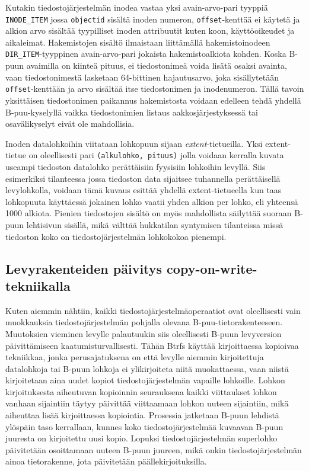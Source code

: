 Kutakin tiedostojärjestelmän inodea vastaa yksi avain-arvo-pari tyyppiä \texttt{INODE\_ITEM} jossa \texttt{objectid} sisältä inoden numeron, \texttt{offset}-kenttää ei käytetä ja alkion arvo sisältää tyypilliset inoden attribuutit kuten koon, käyttöoikeudet ja aikaleimat.
Hakemistojen sisältö ilmaistaan liittämällä hakemistoinodeen \texttt{DIR\_ITEM}-tyyppinen avain-arvo-pari jokaista hakemistoalkiota kohden.
Koska B-puun avaimilla on kiinteä pituus, ei tiedostonimeä voida lisätä osaksi avainta,
vaan tiedostonimestä lasketaan 64-bittinen hajautusarvo,
joka sisällytetään \texttt{offset}-kenttään ja arvo sisältää itse tiedostonimen ja inodenumeron.
Tällä tavoin yksittäisen tiedostonimen paikannus hakemistosta voidaan edelleen tehdä yhdellä B-puu-kyselyllä vaikka tiedostonimien listaus aakkosjärjestyksessä tai osavälikyselyt eivät ole mahdollisia.

Inoden datalohkoihin viitataan lohkopuun sijaan \emph{extent}-tietueilla.
Yksi extent-tietue on oleellisesti pari \texttt{(alkulohko, pituus)} jolla voidaan kerralla kuvata useampi tiedoston datalohko perättäisiin fyysisiin lohkoihin levyllä.
Siis esimerkiksi tilanteessa jossa tiedoston data sijaitsee tuhannella perättäisellä levylohkolla,
voidaan tämä kuvaus esittää yhdellä extent-tietueella kun taas lohkopuuta käyttäessä jokainen lohko vaatii yhden alkion per lohko, eli yhteensä 1000 alkiota.
Pienien tiedostojen sisältö on myös mahdollista säilyttää suoraan B-puun lehtisivun sisällä,
mikä välttää hukkatilan syntymisen tilanteissa missä tiedoston koko on tiedostojärjestelmän lohkokokoa pienempi.

\subsection{Levyrakenteiden päivitys copy-on-write-tekniikalla}
Kuten aiemmin nähtiin, kaikki tiedostojärjestelmäoperaatiot ovat oleellisesti vain muokkauksia tiedostojärjestelmän pohjalla olevana B-puu-tietorakenteeseen.
Muutoksien vieminen levylle palautuukin siis oleellisesti B-puun levyversion päivittämiseen kaatumisturvallisesti.
Tähän Btrfs käyttää kirjoittaessa kopioivaa tekniikkaa,
jonka perusajatuksena on että levylle aiemmin kirjoitettuja datalohkoja tai B-puun lohkoja ei ylikirjoiteta niitä muokattaessa,
vaan niistä kirjoitetaan aina uudet kopiot tiedostojärjestelmän vapaille lohkoille.
Lohkon kirjoituksesta aiheutuvan kopioinnin seurauksena kaikki viittaukset lohkon vanhaan sijaintiin täytyy päivittää viittaamaan lohkon uuteen sijaintiin,
mikä aiheuttaa lisää kirjoittaessa kopiointia.
Prosessia jatketaan B-puun lehdistä ylöspäin taso kerrallaan,
kunnes koko tiedostojärjestelmää kuvaavan B-puun juuresta on kirjoitettu uusi kopio.
Lopuksi tiedostojärjestelmän superlohko päivitetään osoittamaan uuteen B-puun juureen,
mikä onkin tiedostojärjestelmän ainoa tietorakenne,
jota päivitetään päällekirjoituksilla.

